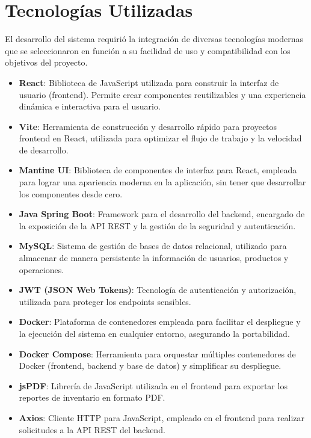 \section{Tecnologías Utilizadas}

El desarrollo del sistema requirió la integración de diversas tecnologías modernas que se seleccionaron en función a su facilidad de uso y compatibilidad con los objetivos del proyecto.

\begin{itemize}
    \item \textbf{React}: Biblioteca de JavaScript utilizada para construir la interfaz de usuario (frontend). Permite crear componentes reutilizables y una experiencia dinámica e interactiva para el usuario.
    \item \textbf{Vite}: Herramienta de construcción y desarrollo rápido para proyectos frontend en React, utilizada para optimizar el flujo de trabajo y la velocidad de desarrollo.
    \item \textbf{Mantine UI}: Biblioteca de componentes de interfaz para React, empleada para lograr una apariencia moderna en la aplicación, sin tener que desarrollar los componentes desde cero.
    \item \textbf{Java Spring Boot}: Framework para el desarrollo del backend, encargado de la exposición de la API REST y la gestión de la seguridad y autenticación.
    \item \textbf{MySQL}: Sistema de gestión de bases de datos relacional, utilizado para almacenar de manera persistente la información de usuarios, productos y operaciones.
    \item \textbf{JWT (JSON Web Tokens)}: Tecnología de autenticación y autorización, utilizada para proteger los endpoints sensibles.
    \item \textbf{Docker}: Plataforma de contenedores empleada para facilitar el despliegue y la ejecución del sistema en cualquier entorno, asegurando la portabilidad.
    \item \textbf{Docker Compose}: Herramienta para orquestar múltiples contenedores de Docker (frontend, backend y base de datos) y simplificar su despliegue.
    \item \textbf{jsPDF}: Librería de JavaScript utilizada en el frontend para exportar los reportes de inventario en formato PDF.
    \item \textbf{Axios}: Cliente HTTP para JavaScript, empleado en el frontend para realizar solicitudes a la API REST del backend.
\end{itemize}

